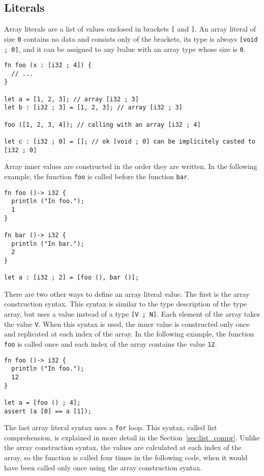 \subsection {Literals}

Array literals are a list of values enclosed in brackets \texttt{[} and
  \texttt{]}. An array literal of size \texttt{0} contains no data and consists
only of the brackets, its type is always \texttt{[void ; 0]}, and it can be
assigned to any lvalue with an array type whose size is \texttt{0}.

\begin{lstlisting}[style=coloredverbatim]
fn foo (x : [i32 ; 4]) {
  // ...
}

let a = [1, 2, 3]; // array [i32 ; 3]
let b : [i32 ; 3] = [1, 2, 3]; // array [i32 ; 3]

foo ([1, 2, 3, 4]); // calling with an array [i32 ; 4]

let c : [i32 ; 0] = []; // ok [void ; 0] can be implicitely casted to [i32 ; 0]
\end{lstlisting}

Array inner values are constructed in the order they are written. In the
following example, the function \texttt{foo} is called before the function
\texttt{bar}.

\begin{lstlisting}[style=coloredverbatim]
fn foo ()-> i32 {
  println ("In foo.");
  1
}

fn bar ()-> i32 {
  println ("In bar.");
  2
}

let a : [i32 ; 2] = [foo (), bar ()];
\end{lstlisting}

There are two other ways to define an array literal value. The first is the
array construction syntax. This syntax is similar to the type description of the
type array, but uses a value instead of a type \texttt{[V ; N]}. Each element of
the array takes the value \texttt{V}. When this syntax is used, the inner value
is constructed only once and replicated at each index of the array. In the
following example, the function \texttt{foo} is called once and each index of
the array contains the value \texttt{12}.

\begin{lstlisting}[style=coloredverbatim]
fn foo ()-> i32 {
  println ("In foo.");
  12
}

let a = [foo () ; 4];
assert (a [0] == a [1]);
\end{lstlisting}

\smallskip
The last array literal syntax uses a \texttt{for} loop. This syntax, called list
comprehension, is explained in more detail in the Section~\ref{sec:list_compr}.
Unlike the array construction syntax, the values are calculated at each index of
the array, so the function is called four times in the following code, when it
would have been called only once using the array construction syntax.

